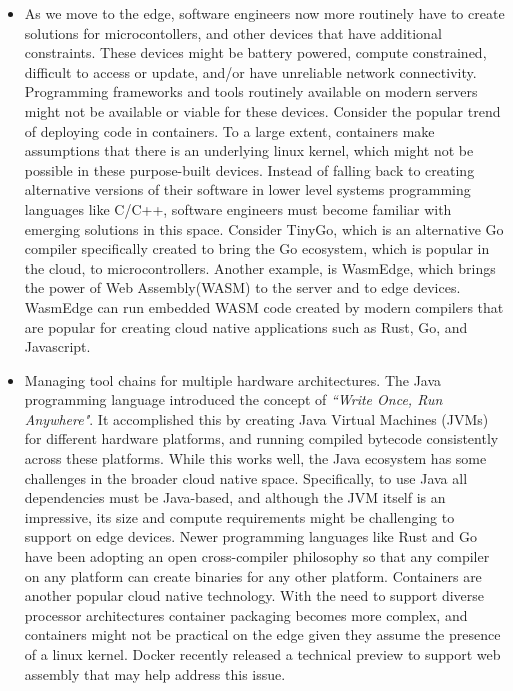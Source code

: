 \documentclass[conference]{IEEEtran}
\begin{document}
\begin{itemize}
	\item As we move to the edge, software engineers now more routinely have to create solutions for microcontollers, and other devices that have additional constraints.  These devices might be battery powered, compute constrained, difficult to access or update, and/or have unreliable network connectivity. Programming frameworks and tools routinely available on modern servers might not be available or viable for these devices.  Consider the popular trend of deploying code in containers.  To a large extent, containers make assumptions that there is an underlying linux kernel, which might not be possible in these purpose-built devices. Instead of falling back to creating alternative versions of their software in lower level systems programming languages like C/C++, software engineers must become familiar with emerging solutions in this space.  Consider TinyGo\cite{TinyGo}, which is an alternative Go compiler specifically created to bring the Go ecosystem, which is popular in the cloud, to microcontrollers.  Another example, is WasmEdge\cite{WASMEdge}, which brings the power of Web Assembly(WASM) to the server and to edge devices.  WasmEdge can run embedded WASM code created by modern compilers that are popular for creating cloud native applications such as Rust, Go, and Javascript.       
	
	\item Managing tool chains for multiple hardware architectures.  The Java programming language introduced the concept of \textit{``Write Once, Run Anywhere"}. It accomplished this by creating Java Virtual Machines (JVMs) for different hardware platforms, and running compiled bytecode consistently across these platforms.  While this works well, the Java ecosystem has some challenges in the broader cloud native space.  Specifically, to use Java all dependencies must be Java-based, and although the JVM itself is an impressive, its size and compute requirements might be challenging to support on edge devices. Newer programming languages like Rust and Go have been adopting an open cross-compiler philosophy so that any compiler on any platform can create binaries for any other platform.  Containers are another popular cloud native technology.  With the need to support diverse processor architectures container packaging becomes more complex, and containers might not be practical on the edge given they assume the presence of a linux kernel.  Docker recently released a technical preview to support web assembly that may help address this issue\cite{DockerWASM}.
\end{itemize}
 
\end{document}
